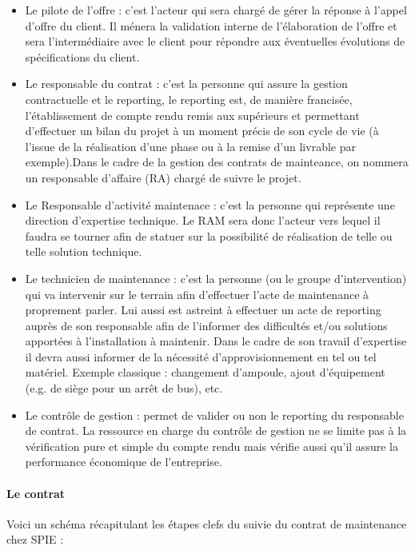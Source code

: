 \begin{itemize}
\item Le pilote de l'offre : c'est l'acteur qui sera chargé de gérer la réponse à l'appel d'offre du client. Il ménera la validation interne de l'élaboration de l'offre et sera l'intermédiaire avec le client pour répondre aux éventuelles évolutions de spécifications du client.
\item Le responsable du contrat : c’est la personne qui assure la gestion contractuelle et le reporting, le reporting est, de manière francisée, l’établissement de compte rendu remis aux supérieurs et permettant d’effectuer un bilan du projet à un moment précis de son cycle de vie (à l’issue de la réalisation d’une phase ou à la remise d’un livrable par exemple).Dans le cadre de la gestion des contrats de mainteance, on nommera un responsable d'affaire (RA) chargé de suivre le projet.
\item Le Responsable d'activité maintenace : c'est la personne qui représente une direction d'expertise technique. Le RAM sera donc l'acteur vers lequel il faudra se tourner afin de statuer sur la possibilité de réalisation de telle ou telle solution technique.
\item Le technicien de maintenance : c’est la personne (ou le groupe d’intervention) qui va intervenir sur le terrain afin d'effectuer l’acte de maintenance à proprement parler. Lui aussi est astreint à effectuer un acte de reporting auprès de son responsable afin de l'informer des difficultés et/ou solutions apportées à l’installation à maintenir. Dans le cadre de son travail d’expertise il devra aussi informer de la nécessité d’approvisionnement en tel ou tel matériel. Exemple classique : changement d’ampoule, ajout d'équipement (e.g. de siège pour un arrêt de bus), etc.
\item Le contrôle de gestion : permet de valider ou non le reporting du responsable de contrat. La ressource en charge du contrôle de gestion ne se limite pas à la vérification pure et simple du compte rendu mais vérifie aussi qu'il assure la performance économique de l’entreprise.
\end{itemize}


\paragraph{Le contrat}
Voici un schéma récapitulant les étapes clefs du suivie du contrat de maintenance chez SPIE :

